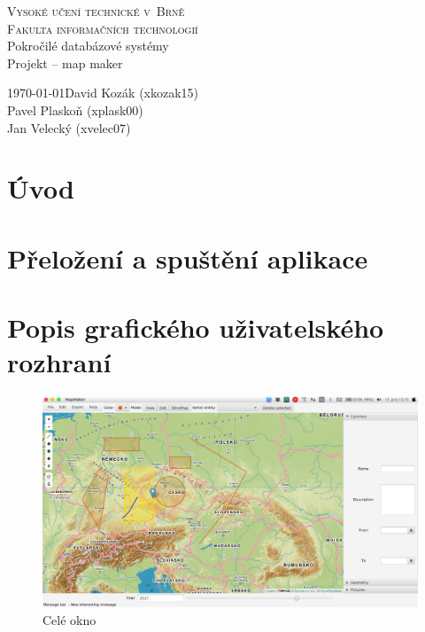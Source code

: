\documentclass[12pt,a4paper,titlepage]{article}
\begin{document}
\begin{titlepage}
\begin{center}
    {
    	\Huge\textsc{Vysoké učení technické v~Brně}}\\
    \smallskip
    {
    	\huge\textsc{Fakulta informačních technologií}}\\
    \bigskip
    \huge{Pokročilé databázové systémy}\\
    \smallskip
    \Huge{Projekt -- map maker}\\
\end{center}
    {\Large \today \hfill David Kozák (xkozak15)  }\\
    \smallskip
    {\Large \hfill Pavel Plaskoň (xplask00)  }\\
    \smallskip
    {\Large \hfill Jan Velecký (xvelec07)  }\\
\end{titlepage}

\newpage
\tableofcontents
\newpage

\section{Úvod}

\section{Přeložení a spuštění aplikace}

\section{Popis grafického uživatelského rozhraní}

\begin{figure}[!htbp]
	\centering
	\includegraphics[scale=0.3]{full_window}
	\caption{Celé okno}
	\label{fullWindow}
\end{figure}
\end{document}
